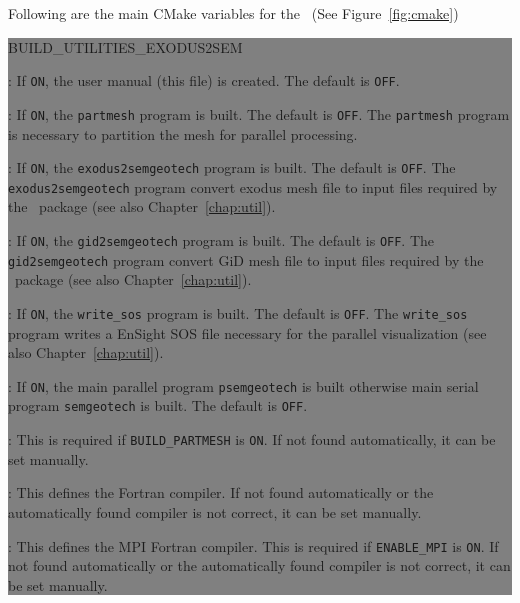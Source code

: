 Following are the main CMake variables for the \pack\ (See Figure~\ref{fig:cmake})

\colorbox{gray}{
\parbox{15.5cm}{
\begin{adescription}{BUILD\_UTILITIES\_EXODUS2SEM}
\item[BUILD\_DOCUMENTATION]           : If \texttt{ON}, the user manual (this file) is created. The default is \texttt{OFF}.
\item[BUILD\_PARTMESH]                : If \texttt{ON}, the \texttt{partmesh} program is built. The default is \texttt{OFF}. The \texttt{partmesh} program is necessary to partition the mesh for parallel processing.
\item[BUILD\_EXODUS2SEMGEOTECH]   : If \texttt{ON}, the \texttt{exodus2semgeotech} program is built. The default is \texttt{OFF}. The \texttt{exodus2semgeotech} program convert exodus mesh file to input files required by the \pack\ package (see also Chapter~\ref{chap:util}).
\item[BUILD\_GID2SEMGEOTECH]   : If \texttt{ON}, the \texttt{gid2semgeotech} program is built. The default is \texttt{OFF}. The \texttt{gid2semgeotech} program convert GiD mesh file to input files required by the \pack\ package (see also Chapter~\ref{chap:util}).
\item[BUILD\_WRITE\_SOS]   : If \texttt{ON}, the \texttt{write\_sos} program is built. The default is \texttt{OFF}. The \texttt{write\_sos} program writes a EnSight SOS file necessary for the parallel visualization (see also Chapter~\ref{chap:util}).
\item[ENABLE\_MPI]                    : If \texttt{ON}, the main parallel program \texttt{psemgeotech} is built otherwise main serial program \texttt{semgeotech} is built. The default is \texttt{OFF}.
\item[SCOTCH\_LIBRARY\_PATH]          : This is required if \texttt{BUILD\_PARTMESH} is \texttt{ON}. If not found automatically, it can be set manually.
\item[CMAKE\_Fortran\_COMPILER]       : This defines the Fortran compiler. If not found automatically or the automatically found compiler is not correct, it can be set manually.
\item[MPI\_Fortran\_COMPILER]       : This defines the MPI Fortran compiler. This is required if \texttt{ENABLE\_MPI} is \texttt{ON}. If not found automatically or the automatically found compiler is not correct, it can be set manually.
\end{adescription}
}}\\

